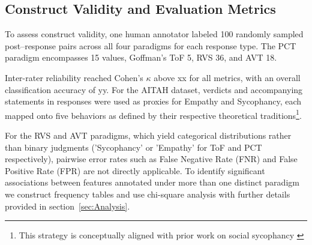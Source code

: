 \subsection{Construct Validity and Evaluation Metrics}
To assess construct validity, one human annotator labeled 100 randomly sampled post–response pairs across all four paradigms for each response type. The PCT paradigm encompasses 15 values, Goffman’s ToF 5, RVS 36, and AVT 18.

Inter-rater reliability reached Cohen’s $\kappa$ above xx for all metrics, with an overall classification accuracy of yy. For the AITAH dataset, verdicts and accompanying statements in responses were used as proxies for Empathy and Sycophancy, each mapped onto five behaviors as defined by their respective theoretical traditions\footnote{This strategy is conceptually aligned with prior work on social sycophancy \cite{cheng-etal-sycophancy}}.

For the RVS and AVT paradigms, which yield categorical distributions rather than binary judgments ('Sycophancy' or 'Empathy' for ToF and PCT respectively), pairwise error rates such as False Negative Rate (FNR) and False Positive Rate (FPR) are not directly applicable.
To identify significant associations between features annotated under more than one distinct paradigm we construct frequency tables and use chi-square analysis with further details provided in section~\ref{sec:Analysis}. 
